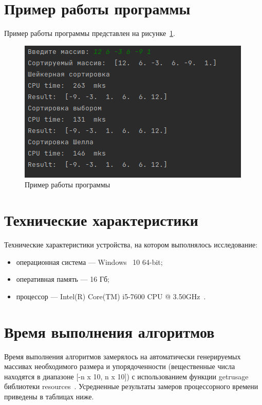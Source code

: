 \documentclass[12pt]{report}
\begin{document}
    \section{Пример работы программы}
    Пример работы программы представлен на рисунке~\ref{fig:work_example}.
    \captionsetup{singlelinecheck=true}
    \begin{figure}[H]
        \centering
        \includegraphics[width=0.7\linewidth]{img/example}
        \caption{Пример работы программы}
        \label{fig:work_example}
    \end{figure}


    \section{Технические характеристики}
    Технические характеристики устройства, на котором выполнялось исследование:
    \begin{itemize}
        \item операционная система --- Windows~\cite{windows} 10 64-bit;
        \item оперативная память --- 16 Гб;
        \item процессор --- Intel(R) Core(TM) i5-7600 CPU @ 3.50GHz~\cite{i5}.
    \end{itemize}


    \section{Время выполнения алгоритмов}
    Время выполнения алгоритмов замерялось на автоматически генерируемых массивах необходимого размера
    и упорядоченности (вещественные числа находятся в диапазоне [-n x 10, n x 10]) с использованием функции
    getrusage библиотеки resources~\cite{resource}.
    Усредненные результаты замеров процессорного времени приведены в таблицах ниже.
\end{document}
